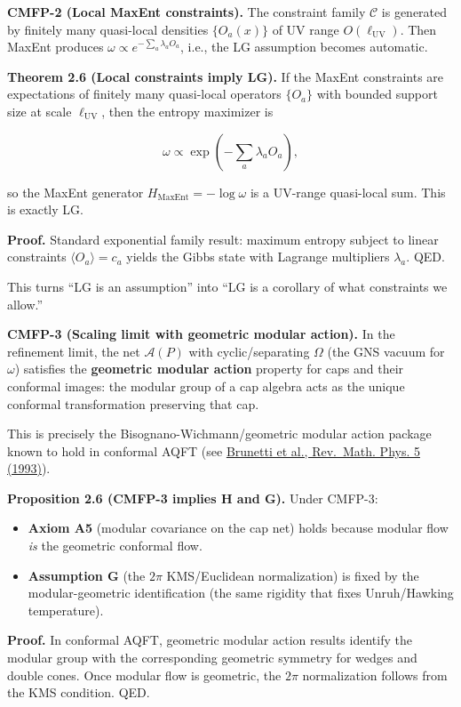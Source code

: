 \documentclass[
]{article}
\providecommand{\tightlist}{%
  \setlength{\itemsep}{0pt}\setlength{\parskip}{0pt}}
\begin{document}
\textbf{CMFP-2 (Local MaxEnt constraints).} The constraint family
\(\mathcal{C}\) is generated by finitely many quasi-local densities
\(\{O_a(x)\}\) of UV range \(O(\ell_{\mathrm{UV}})\). Then MaxEnt
produces \(\omega \propto e^{-\sum_a \lambda_a O_a}\), i.e., the LG
assumption becomes automatic.

\textbf{Theorem 2.6 (Local constraints imply LG).} If the MaxEnt
constraints are expectations of finitely many quasi-local operators
\(\{O_a\}\) with bounded support size at scale \(\ell_{\mathrm{UV}}\),
then the entropy maximizer is

\[
\omega \propto \exp\left(-\sum_a \lambda_a O_a\right),
\]

so the MaxEnt generator \(H_{\mathrm{MaxEnt}} = -\log \omega\) is a
UV-range quasi-local sum. This is exactly LG.

\textbf{Proof.} Standard exponential family result: maximum entropy
subject to linear constraints \(\langle O_a \rangle = c_a\) yields the
Gibbs state with Lagrange multipliers \(\lambda_a\). QED.

This turns ``LG is an assumption'' into ``LG is a corollary of what
constraints we allow.''

\textbf{CMFP-3 (Scaling limit with geometric modular action).} In the
refinement limit, the net \(\mathcal{A}(P)\) with cyclic/separating
\(\Omega\) (the GNS vacuum for \(\omega\)) satisfies the
\textbf{geometric modular action} property for caps and their conformal
images: the modular group of a cap algebra acts as the unique conformal
transformation preserving that cap.

This is precisely the Bisognano-Wichmann/geometric modular action
package known to hold in conformal AQFT (see
\href{https://arxiv.org/abs/funct-an/9302008}{Brunetti et al.,
Rev.~Math. Phys. 5 (1993)}).

\textbf{Proposition 2.6 (CMFP-3 implies H and G).} Under CMFP-3:

\begin{itemize}
\tightlist
\item
  \textbf{Axiom A5} (modular covariance on the cap net) holds because
  modular flow \emph{is} the geometric conformal flow.
\item
  \textbf{Assumption G} (the \(2\pi\) KMS/Euclidean normalization) is
  fixed by the modular-geometric identification (the same rigidity that
  fixes Unruh/Hawking temperature).
\end{itemize}

\textbf{Proof.} In conformal AQFT, geometric modular action results
identify the modular group with the corresponding geometric symmetry for
wedges and double cones. Once modular flow is geometric, the \(2\pi\)
normalization follows from the KMS condition. QED.
\end{document}
